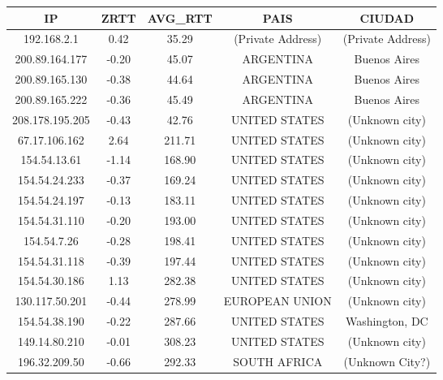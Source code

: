 \begin{tabular}{|c@{\hspace{5ex}}c@{\hspace{5ex}}c@{\hspace{5ex}}c@{\hspace{5ex}}c|}
 \hline
 \rule{0pt}{1.2em}IP & ZRTT & AVG\_RTT & PAIS & CIUDAD\\[0.2em]
 \hline

\rule{0pt}{1.2em} 192.168.2.1  &  0.42 & 35.29 & (Private Address) & (Private Address) \\[0.2em]
\rule{0pt}{1.2em} 200.89.164.177  &  -0.20 & 45.07 & ARGENTINA & Buenos Aires \\[0.2em]
\rule{0pt}{1.2em} 200.89.165.130  &  -0.38 & 44.64 & ARGENTINA & Buenos Aires \\[0.2em]
\rule{0pt}{1.2em} 200.89.165.222  &  -0.36 & 45.49 & ARGENTINA & Buenos Aires \\[0.2em]
\rule{0pt}{1.2em} 208.178.195.205  &  -0.43 & 42.76 & UNITED STATES & (Unknown city) \\[0.2em]
\rule{0pt}{1.2em} 67.17.106.162  &  2.64 & 211.71 & UNITED STATES & (Unknown city) \\[0.2em]
\rule{0pt}{1.2em} 154.54.13.61  &  -1.14 & 168.90 & UNITED STATES & (Unknown city) \\[0.2em]
\rule{0pt}{1.2em} 154.54.24.233  &  -0.37 & 169.24 & UNITED STATES & (Unknown city) \\[0.2em]
\rule{0pt}{1.2em} 154.54.24.197  &  -0.13 & 183.11 & UNITED STATES & (Unknown city) \\[0.2em]
\rule{0pt}{1.2em} 154.54.31.110  &  -0.20 & 193.00 & UNITED STATES & (Unknown city) \\[0.2em]
\rule{0pt}{1.2em} 154.54.7.26  &  -0.28 & 198.41 & UNITED STATES & (Unknown city) \\[0.2em]
\rule{0pt}{1.2em} 154.54.31.118  &  -0.39 & 197.44 & UNITED STATES & (Unknown city) \\[0.2em]
\rule{0pt}{1.2em} 154.54.30.186  &  1.13 & 282.38 & UNITED STATES & (Unknown city) \\[0.2em]
\rule{0pt}{1.2em} 130.117.50.201  &  -0.44 & 278.99 & EUROPEAN UNION & (Unknown city) \\[0.2em]
\rule{0pt}{1.2em} 154.54.38.190  &  -0.22 & 287.66 & UNITED STATES & Washington, DC \\[0.2em]
\rule{0pt}{1.2em} 149.14.80.210  &  -0.01 & 308.23  & UNITED STATES & (Unknown city) \\[0.2em]
\rule{0pt}{1.2em} 196.32.209.50  &  -0.66 & 292.33 & SOUTH AFRICA & (Unknown City?) \\[0.2em]

\end{tabular}

